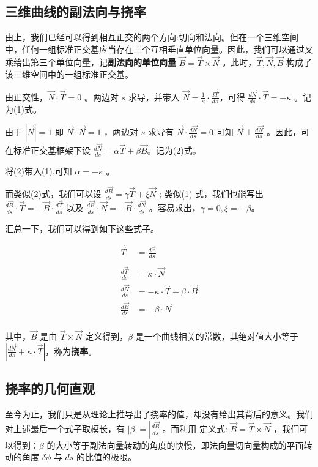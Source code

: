 \documentclass[fontset=windows]{article}
\begin{document}
\subsection{三维曲线的副法向与挠率}
由上，我们已经可以得到相互正交的两个方向:切向和法向。但在一个三维空间中，任何一组标准正交基应当存在三个互相垂直单位向量。因此，我们可以通过叉乘给出第三个单位向量，记\textbf{副法向的单位向量} $\vec{B} = \vec{T} \times \vec{N}$ 。此时，$\vec{T},\vec{N},\vec{B}$ 构成了该三维空间中的一组标准正交基。

由正交性，$\vec N \cdot \vec T = 0$ 。两边对 $s$ 求导，并带入 $\vec N = \frac1{\kappa} \cdot \frac{d\vec T}{ds} $，可得 $\frac{d\vec N}{ds} \cdot \vec T = -\kappa$ 。记为(1)式。

由于 $|\vec{N}| = 1$ 即 $\vec N \cdot \vec N = 1$ ，两边对 $s$ 求导有 $\vec N\cdot \frac{d\vec N}{ds} = 0$ 可知 $\vec N \perp \frac{d\vec N}{ds}$ 。因此，可在标准正交基框架下设 $\frac{d\vec N}{ds} = \alpha \vec T + \beta \vec B $。记为(2)式。

将(2)带入(1),可知 $\alpha = -\kappa$ 。

而类似(2)式，我们可以设 $\frac{d\vec B}{ds} = \gamma \vec T + \xi \vec N $ ; 类似(1) 式，我们也能写出 $\frac{d\vec B}{ds} \cdot \vec T = -\vec{B} \cdot \frac{d\vec T}{ds} $ 以及 $ \frac{d\vec B}{ds} \cdot \vec N = -\vec{B} \cdot \frac{d\vec N}{ds} $ 。容易求出，$\gamma = 0,\xi = -\beta$。

汇总一下，我们可以得到如下这些式子。

$$
\begin{aligned}
\vec{T} &= \frac{d\vec{r}}{ds}\\
\\
\frac{d\vec T}{ds} &= \kappa \cdot \vec N \\
\frac{d\vec N}{ds} &= -\kappa \cdot \vec T + \beta \cdot \vec B\\
\frac{d\vec B}{ds} &= -\beta \cdot \vec N \\
\end{aligned}
$$

其中，$\vec B$ 是由 $\vec T \times \vec N$ 定义得到，$\beta$ 是一个曲线相关的常数，其绝对值大小等于 $|\frac{d\vec N}{ds} + \kappa \cdot \vec T|$，称为\textbf{挠率}。

\subsection{挠率的几何直观}

至今为止，我们只是从理论上推导出了挠率的值，却没有给出其背后的意义。我们对上述最后一个式子取模长，有 $|\beta| = |\frac{d\vec B}{ds}|$。而利用 定义式: $\vec B = \vec T \times \vec N$ ，我们可以得到：$\beta$ 的大小等于副法向量转动的角度的快慢，即法向量切向量构成的平面转动的角度 $\delta \phi$ 与 $ds$ 的比值的极限。
\end{document}
